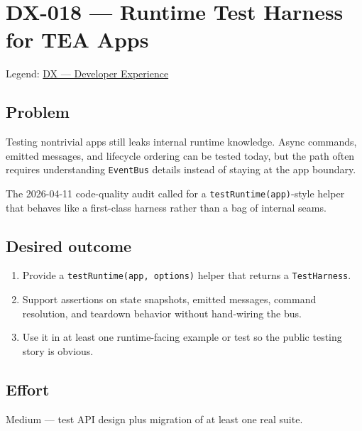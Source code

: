 \chapter{DX-018 --- Runtime Test Harness for TEA Apps}\label{record-327}

\smallskip

Legend: \href{https://github.com/flyingrobots/bijou/blob/cbd70612140e7a450d764b3c7be1c6af878b99bc/docs/method/graveyard/legends/DX-developer-experience.md}{DX --- Developer Experience}

\section{Problem}\label{record-327-problem}

Testing nontrivial apps still leaks internal runtime knowledge. Async commands, emitted messages, and lifecycle ordering can be tested today, but the path often requires understanding \texttt{E\allowbreak{}v\allowbreak{}e\allowbreak{}n\allowbreak{}t\allowbreak{}B\allowbreak{}u\allowbreak{}s} details instead of staying at the app boundary.

The 2026-04-11 code-quality audit called for a \texttt{t\allowbreak{}e\allowbreak{}s\allowbreak{}t\allowbreak{}R\allowbreak{}u\allowbreak{}n\allowbreak{}t\allowbreak{}i\allowbreak{}m\allowbreak{}e\allowbreak{}(\allowbreak{}a\allowbreak{}p\allowbreak{}p\allowbreak{})}-style helper that behaves like a first-class harness rather than a bag of internal seams.

\section{Desired outcome}\label{record-327-desired-outcome}

\begin{enumerate}
\def\labelenumi{\arabic{enumi}.}
\tightlist
\item
  Provide a \texttt{t\allowbreak{}e\allowbreak{}s\allowbreak{}t\allowbreak{}R\allowbreak{}u\allowbreak{}n\allowbreak{}t\allowbreak{}i\allowbreak{}m\allowbreak{}e\allowbreak{}(\allowbreak{}a\allowbreak{}p\allowbreak{}p\allowbreak{},\allowbreak{} \allowbreak{}o\allowbreak{}p\allowbreak{}t\allowbreak{}i\allowbreak{}o\allowbreak{}n\allowbreak{}s\allowbreak{})} helper that returns a \texttt{T\allowbreak{}e\allowbreak{}s\allowbreak{}t\allowbreak{}H\allowbreak{}a\allowbreak{}r\allowbreak{}n\allowbreak{}e\allowbreak{}s\allowbreak{}s}.
\item
  Support assertions on state snapshots, emitted messages, command resolution, and teardown behavior without hand-wiring the bus.
\item
  Use it in at least one runtime-facing example or test so the public testing story is obvious.
\end{enumerate}

\section{Effort}\label{record-327-effort}

Medium --- test API design plus migration of at least one real suite.

